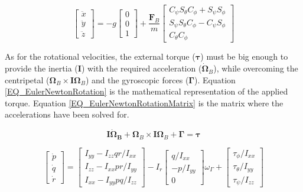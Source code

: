 \begin{equation}
\begin{bmatrix} \ddot{x}\\ \ddot{y}\\ \ddot{z} \end{bmatrix} = -g\begin{bmatrix} 0\\ 0\\ 1 \end{bmatrix} + \frac{\textbf{F}_B}{m} \begin{bmatrix}
C_\psi S_\theta C_\phi + S_\psi S_\phi\\
S_\psi S_\theta C_\phi - C_\psi S_\phi\\
C_\theta C_\phi
\end{bmatrix}
\label{EQ_EulerNewtonInertialMatrix}
\end{equation}

As for the rotational velocities, the external torque ($\boldsymbol{\tau}$) must be big enough to provide the inertia ($\textbf{I}$) with the required acceleration ($\boldsymbol{\dot{\Omega}}_B$), while overcoming the centripetal ($\boldsymbol{\Omega}_B \times \textbf{I}\boldsymbol{\Omega}_B$) and the gyroscopic forces ($\boldsymbol{\Gamma}$). Equation \eqref{EQ_EulerNewtonRotation} is the mathematical representation of the applied torque. Equation \eqref{EQ_EulerNewtonRotationMatrix} is the matrix where the accelerations have been solved for.

\begin{equation}
\textbf{I} {\boldsymbol{\dot{\Omega}_B}} + \boldsymbol{\Omega}_B \times \textbf{I}\boldsymbol{\Omega}_B + \boldsymbol{\Gamma} = \boldsymbol{\tau}
\label{EQ_EulerNewtonRotation}
\end{equation}

\begin{equation}
\begin{bmatrix}\dot{p}\\ \dot{q} \\ \dot{r} \end{bmatrix} = \begin{bmatrix} I_{yy} - I_{zz}qr/I_{xx}\\ I_{zz} - I_{xx}pr/I_{yy}\\ I_{xx} - I_{yy}pq/I_{zz} \end{bmatrix} - I_r \begin{bmatrix} q/I_{xx}\\ -p/I_{yy} \\ 0 \end{bmatrix} \omega_\Gamma + \begin{bmatrix}\tau_\phi/I_{xx} \\ \tau_\theta/I_{yy} \\ \tau_\psi/I_{zz}  \end{bmatrix}
\label{EQ_EulerNewtonRotationMatrix}
\end{equation}

